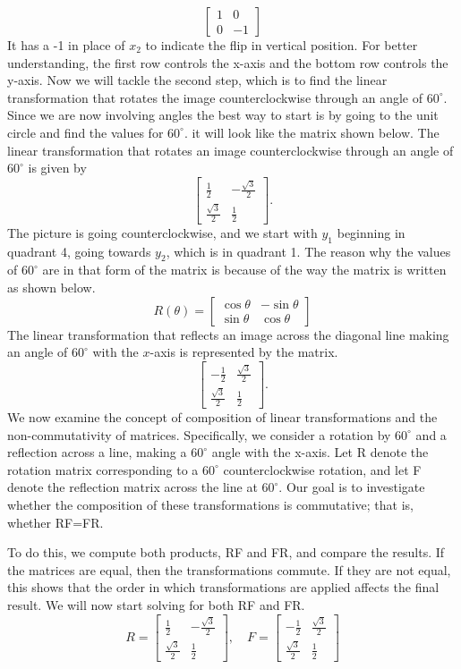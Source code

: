 \[
\begin{bmatrix}
1 & 0 \\
0 & -1
\end{bmatrix}
\]
It has a -1 in place of $x_2$ to indicate the flip in vertical position. For better understanding, the first row controls the x-axis and the bottom row controls the y-axis. Now we will tackle the second step, which is to find the linear transformation that rotates the image counterclockwise through an angle of $60^\circ$. Since we are now involving angles the best way to start is by going to the unit circle and find the values for $60^\circ$. it will look like the matrix shown below. The linear transformation that rotates an image counterclockwise through an angle of $60^\circ$ is given by
\[
\begin{bmatrix}
\frac{1}{2} & -\frac{\sqrt{3}}{2} \\
\frac{\sqrt{3}}{2} & \frac{1}{2}
\end{bmatrix}.
\]
The picture is going counterclockwise, and we start with $y_1$ beginning in quadrant 4, going towards $y_2$, which is in quadrant 1. The reason why the values of $60^\circ$ are in that form of the matrix is because of the way the matrix is written as shown below. 
\[
R(\theta) =
\begin{bmatrix}
\cos\theta & -\sin\theta \\
\sin\theta & \cos\theta
\end{bmatrix}
\]
The linear transformation that reflects an image across the diagonal line making an angle of $60^\circ$ with the $x$-axis is represented by the matrix.
\[
\begin{bmatrix}
-\frac{1}{2} & \frac{\sqrt{3}}{2} \\
\frac{\sqrt{3}}{2} & \frac{1}{2}
\end{bmatrix}.
\]
We now examine the concept of composition of linear transformations and the non-commutativity of matrices. Specifically, we consider a rotation by $60^\circ$
 and a reflection across a line, making a $60^\circ$
 angle with the x-axis. Let
R denote the rotation matrix corresponding to a $60^\circ$
 counterclockwise rotation, and let F denote the reflection matrix across the line at $60^\circ$.
Our goal is to investigate whether the composition of these transformations is commutative; that is, whether RF=FR.

To do this, we compute both products, RF and FR, and compare the results. If the matrices are equal, then the transformations commute. If they are not equal, this shows that the order in which transformations are applied affects the final result.
We will now start solving for both RF and FR. 
\[
R =
\begin{bmatrix}
\frac{1}{2} & -\frac{\sqrt{3}}{2} \\
\frac{\sqrt{3}}{2} & \frac{1}{2}
\end{bmatrix},
\quad
F =
\begin{bmatrix}
-\frac{1}{2} & \frac{\sqrt{3}}{2} \\
\frac{\sqrt{3}}{2} & \frac{1}{2}
\end{bmatrix}
\]

